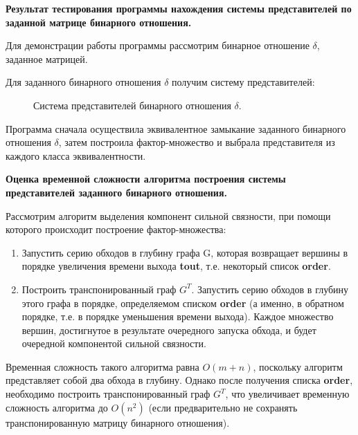 \documentclass[spec, och, otchet, hidelinks]{SCWorks}
\begin{document}
\newpage

\par \textbf{Результат тестирования программы нахождения системы представителей
  по заданной матрице бинарного отношения.}

\par Для демонстрации работы программы рассмотрим бинарное
отношение $\delta$, заданное матрицей.

\par Для заданного бинарного отношения $\delta$ получим систему представителей:

\begin{figure}[h]
	\caption{Система представителей бинарного отношения $\delta$.}
\end{figure}

\par Программа сначала осуществила эквивалентное замыкание заданного бинарного
отношения $\delta$, затем построила фактор-множество и выбрала представителя из
каждого класса эквивалентности. \\

\newpage

\par \textbf{Оценка временной сложности алгоритма построения системы
  представителей заданного бинарного отношения.}

Рассмотрим алгоритм выделения компонент сильной связности, при помощи которого
происходит построение фактор-множества:

\begin{enumerate}
\item Запустить серию обходов в глубину графа G, которая возвращает вершины в
  порядке увеличения времени выхода \textbf{tout}, т.е. некоторый список
  \textbf{order}.
\item Построить транспонированный граф $G^T$. Запустить серию обходов в
  глубину этого графа в порядке, определяемом списком \textbf{order} (а
  именно, в обратном порядке, т.е. в порядке уменьшения времени выхода). Каждое
  множество вершин, достигнутое в результате очередного запуска обхода, и будет
  очередной компонентой сильной связности.
\end{enumerate}

Временная сложность такого алгоритма равна $O(m + n)$, поскольку алгоритм
представляет собой два обхода в глубину. Однако после получения списка
\textbf{order}, необходимо построить транспонированный граф $G^T$, что
увеличивает временную сложность алгоритма до $O(n^2)$ (если предварительно не
сохранять транспонированную матрицу бинарного отношения).
\end{document}
